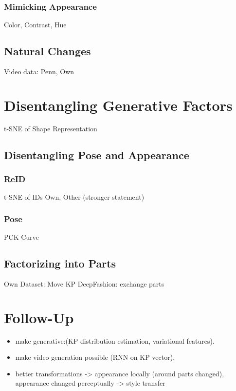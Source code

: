 	\subsubsection{Mimicking Appearance}
	Color, Contrast, Hue
	\subsection{Natural Changes}
	Video data: Penn, Own
\section{Disentangling Generative Factors}
	t-SNE of Shape Representation
	\subsection{Disentangling Pose and Appearance}
	\subsubsection{ReID}
	t-SNE of IDs
	Own, Other (stronger statement)
	\subsubsection{Pose}
	PCK Curve
	\subsection{Factorizing into Parts}
		Own Dataset: Move KP
		DeepFashion: exchange parts
\section{Follow-Up}
	\begin{itemize}
		\item make generative:(KP distribution estimation, variational features).
		\item make video generation possible (RNN on KP vector).
		\item better transformations -> appearance locally (around parts changed), appearance changed perceptually -> style transfer
	\end{itemize}





